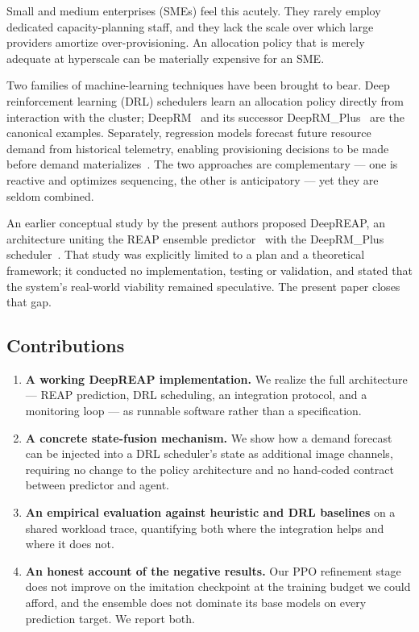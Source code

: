 \documentclass[runningheads]{llncs}
\begin{document}
Small and medium enterprises (SMEs) feel this acutely. They rarely
employ dedicated capacity-planning staff, and they lack the scale over
which large providers amortize over-provisioning. An allocation policy
that is merely adequate at hyperscale can be materially expensive for
an SME.

Two families of machine-learning techniques have been brought to bear.
Deep reinforcement learning (DRL) schedulers learn an allocation
policy directly from interaction with the cluster; DeepRM~\cite{mao2016}
and its successor DeepRM\_Plus~\cite{guo2021} are the canonical
examples. Separately, regression models forecast future resource
demand from historical telemetry, enabling provisioning decisions to be
made before demand materializes~\cite{bankole2013,kaur2019}. The two
approaches are complementary --- one is reactive and optimizes
sequencing, the other is anticipatory --- yet they are seldom combined.

An earlier conceptual study by the present authors proposed DeepREAP,
an architecture uniting the REAP ensemble predictor~\cite{kaur2019}
with the DeepRM\_Plus scheduler~\cite{guo2021}. That study was
explicitly limited to a plan and a theoretical framework; it conducted
no implementation, testing or validation, and stated that the
system's real-world viability remained speculative. The present paper
closes that gap.

\subsection{Contributions}

\begin{enumerate}
\item \textbf{A working DeepREAP implementation.} We realize the full
architecture --- REAP prediction, DRL scheduling, an integration
protocol, and a monitoring loop --- as runnable software rather than a
specification.
\item \textbf{A concrete state-fusion mechanism.} We show how a
demand forecast can be injected into a DRL scheduler's state as
additional image channels, requiring no change to the policy
architecture and no hand-coded contract between predictor and agent.
\item \textbf{An empirical evaluation against heuristic and DRL
baselines} on a shared workload trace, quantifying both where the
integration helps and where it does not.
\item \textbf{An honest account of the negative results.} Our PPO
refinement stage does not improve on the imitation checkpoint at the
training budget we could afford, and the ensemble does not dominate
its base models on every prediction target. We report both.
\end{enumerate}
\end{document}
